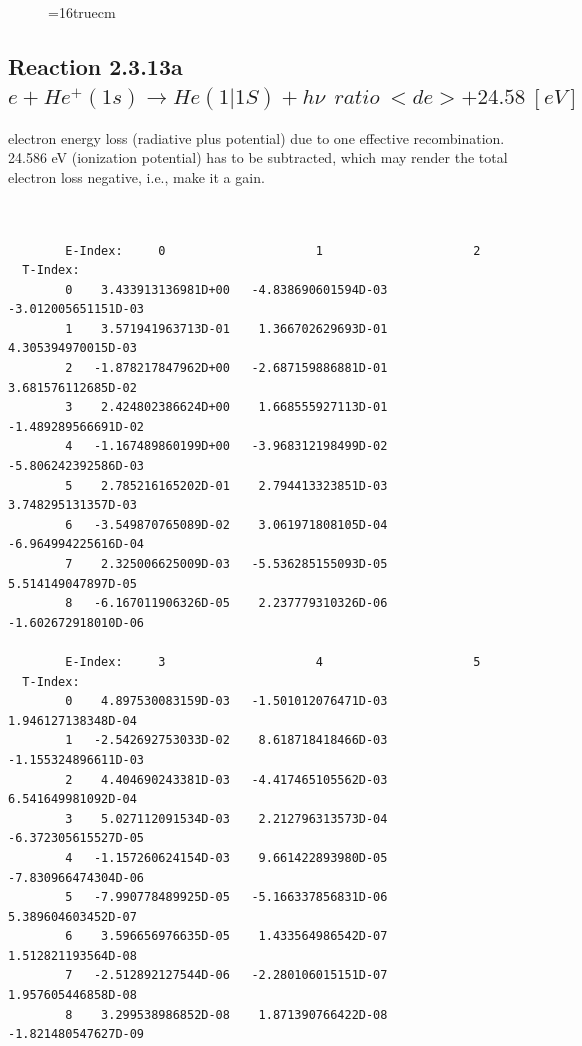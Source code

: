 \documentclass[12pt,dvips]{article}
\begin{document}
\begin{figure} \label{2.3.9aec}
\epsfxsize=16truecm
\end{figure}
\newpage



\subsection{
Reaction 2.3.13a $e + He^+(1s) \rightarrow   He(1|1S)+ h\nu \ \  ratio ~<de>+24.58 \ [eV]$ }


  electron energy loss (radiative plus potential) due to one effective
  recombination. 24.586 eV (ionization potential) has to be
  subtracted, which may render the total electron loss negative, i.e., make it a gain.

\begin{small}\begin{verbatim}


        E-Index:     0                     1                     2
  T-Index:
        0    3.433913136981D+00   -4.838690601594D-03   -3.012005651151D-03
        1    3.571941963713D-01    1.366702629693D-01    4.305394970015D-03
        2   -1.878217847962D+00   -2.687159886881D-01    3.681576112685D-02
        3    2.424802386624D+00    1.668555927113D-01   -1.489289566691D-02
        4   -1.167489860199D+00   -3.968312198499D-02   -5.806242392586D-03
        5    2.785216165202D-01    2.794413323851D-03    3.748295131357D-03
        6   -3.549870765089D-02    3.061971808105D-04   -6.964994225616D-04
        7    2.325006625009D-03   -5.536285155093D-05    5.514149047897D-05
        8   -6.167011906326D-05    2.237779310326D-06   -1.602672918010D-06

        E-Index:     3                     4                     5
  T-Index:
        0    4.897530083159D-03   -1.501012076471D-03    1.946127138348D-04
        1   -2.542692753033D-02    8.618718418466D-03   -1.155324896611D-03
        2    4.404690243381D-03   -4.417465105562D-03    6.541649981092D-04
        3    5.027112091534D-03    2.212796313573D-04   -6.372305615527D-05
        4   -1.157260624154D-03    9.661422893980D-05   -7.830966474304D-06
        5   -7.990778489925D-05   -5.166337856831D-06    5.389604603452D-07
        6    3.596656976635D-05    1.433564986542D-07    1.512821193564D-08
        7   -2.512892127544D-06   -2.280106015151D-07    1.957605446858D-08
        8    3.299538986852D-08    1.871390766422D-08   -1.821480547627D-09


\end{verbatim}
\end{small}
\end{document}
